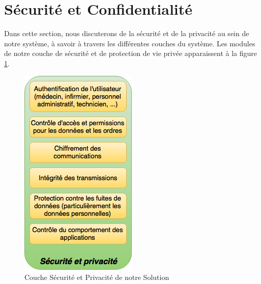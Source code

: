 \documentclass{article}
\begin{document}
\section{Sécurité et Confidentialité}
Dans cette section, nous discuterons de la sécurité et de la privacité au sein de notre système, à savoir à travers les différentes couches du système. Les modules de notre couche de sécurité et de protection de vie privée apparaissent à la figure \ref{securite}.
\newline
\begin{figure}[h!]
	\centering
	\includegraphics[width=0.5\textwidth]{securite.png}
	\caption{Couche Sécurité et Privacité de notre Solution}
	\label{securite}
\end{figure}


\end{document}
